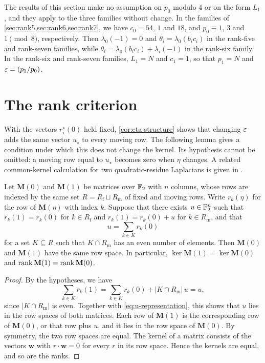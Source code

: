 \begin{remark}\label{rem:three-families}
The results of this section make no assumption on $p_0$ modulo $4$ or on the form $L_1$, and they apply to the three families without change. In the families of \cref{sec:rank5,sec:rank6,sec:rank7}, we have $c_0=54$, $1$ and $18$, and $p_0\equiv1$, $3$ and $1\pmod8$, respectively. Then $\lambda_0(-1)=0$ and $\theta_i=\lambda_0(b_ic_i)$ in the rank-five and rank-seven families, while $\theta_i=\lambda_0(b_ic_i)+\lambda_i(-1)$ in the rank-six family. In the rank-six and rank-seven families, $L_1=N$ and $c_1=1$, so that $p_1=N$ and $\eps=\leg{p_1}{p_0}$.
\end{remark}

\section{The rank criterion}\label{sec:families-criterion}

With the vectors $r_i^\star(0)$ held fixed, \cref{cor:eta-structure} shows that changing $\varepsilon$ adds the same vector $u_\star$ to every moving row. The following lemma gives a condition under which this does not change the kernel. Its hypothesis cannot be omitted: a moving row equal to $u_\star$ becomes zero when $\eta$ changes. A related common-kernel calculation for two quadratic-residue Laplacians is given in \cite[Lemma~4.2]{Savoie2026}.

\begin{lemma}\label{lem:eta-rank}
Let $\mathbf M(0)$ and $\mathbf M(1)$ be matrices over $\mathbb F_2$ with $n$ columns, whose rows are indexed by the same set $R=R_{\mathrm f}\sqcup R_{\mathrm m}$ of fixed and moving rows. Write $r_k(\eta)$ for the row of $\mathbf M(\eta)$ with index $k$. Suppose that there exists $u\in\mathbb F_2^n$ such that $r_k(1)=r_k(0)$ for $k\in R_{\mathrm f}$ and $r_k(1)=r_k(0)+u$ for $k\in R_{\mathrm m}$, and that
\begin{equation}\label{eq:u-representation}
u=\sum_{k\in K}r_k(0)
\end{equation}
for a set $K\subseteq R$ such that $K\cap R_{\mathrm m}$ has an even number of elements. Then $\mathbf M(0)$ and $\mathbf M(1)$ have the same row space. In particular, $\ker\mathbf M(1)=\ker\mathbf M(0)$ and $\operatorname{rank}\mathbf M(1)=\operatorname{rank}\mathbf M(0)$.
\end{lemma}

\begin{proof}
By the hypotheses, we have
\begin{equation}
\sum_{k\in K}r_k(1)=\sum_{k\in K}r_k(0)+|K\cap R_{\mathrm m}|\,u=u,
\end{equation}
since $|K\cap R_{\mathrm m}|$ is even. Together with \eqref{eq:u-representation}, this shows that $u$ lies in the row spaces of both matrices. Each row of $\mathbf M(1)$ is the corresponding row of $\mathbf M(0)$, or that row plus $u$, and it lies in the row space of $\mathbf M(0)$. By symmetry, the two row spaces are equal. The kernel of a matrix consists of the vectors $\mathbf w$ with $r\cdot\mathbf w=0$ for every $r$ in its row space. Hence the kernels are equal, and so are the ranks.
\end{proof}


